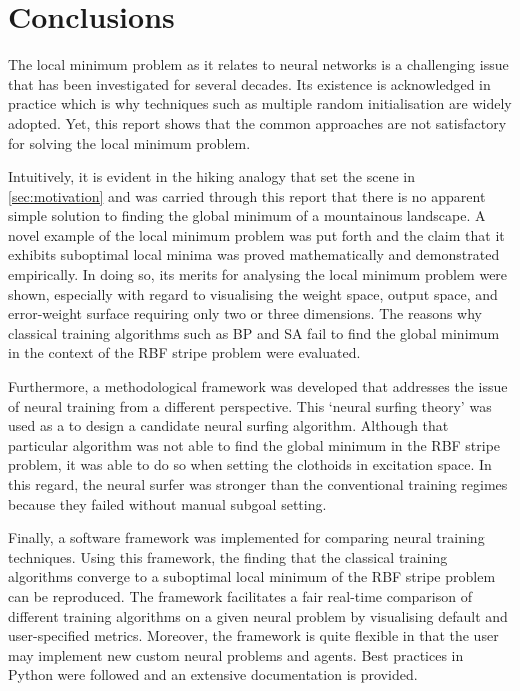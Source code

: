 \chapter{Conclusions}
The local minimum problem as it relates to neural networks is a challenging issue that has been investigated for several decades.
Its existence is acknowledged in practice which is why techniques such as multiple random initialisation are widely adopted.
Yet, this report shows that the common approaches are not satisfactory for solving the local minimum problem.

Intuitively, it is evident in the hiking analogy that set the scene in \ref{sec:motivation} and was carried through this report that there is no apparent simple solution to finding the global minimum of a mountainous landscape.
A novel example of the local minimum problem was put forth and the claim that it exhibits suboptimal local minima was proved mathematically and demonstrated empirically.
In doing so, its merits for analysing the local minimum problem were shown, especially with regard to visualising the weight space, output space, and error-weight surface requiring only two or three dimensions.
The reasons why classical training algorithms such as BP and SA fail to find the global minimum in the context of the RBF stripe problem were evaluated.

Furthermore, a methodological framework was developed that addresses the issue of neural training from a different perspective.
This `neural surfing theory' was used as a to design a candidate neural surfing algorithm.
Although that particular algorithm was not able to find the global minimum in the RBF stripe problem, it was able to do so when setting the clothoids in excitation space.
In this regard, the neural surfer was stronger than the conventional training regimes because they failed without manual subgoal setting.

Finally, a software framework was implemented for comparing neural training techniques.
Using this framework, the finding that the classical training algorithms converge to a suboptimal local minimum of the RBF stripe problem can be reproduced.
The framework facilitates a fair real-time comparison of different training algorithms on a given neural problem by visualising default and user-specified metrics.
Moreover, the framework is quite flexible in that the user may implement new custom neural problems and agents.
Best practices in Python were followed and an extensive documentation is provided.

